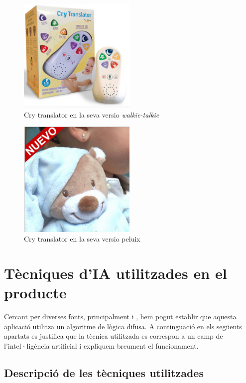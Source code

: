 \documentclass[11pt,a4paper]{article}
\begin{document}
\begin{figure}[hb]
\centering
\includegraphics[width=0.5\textwidth]{./fig/walkie.png}
\caption{Cry translator en la seva versio \emph{walkie-talkie}}
\label{fig:walkie}
\end{figure}

\begin{figure}[ht]
\centering
\includegraphics[width=0.5\textwidth]{./fig/peluix.png}
\caption{Cry translator en la seva versio peluix}
\label{fig:peluix}
\end{figure}

\section{\textsf{Tècniques d'IA utilitzades en el producte}}
\label{tecniques}

Cercant per diverses fonts, principalment \cite{patent} i \cite{elmundo}, hem pogut establir que aquesta aplicació utilitza un algoritme de lògica difusa. A continguació en els següents apartats es justifica que la tècnica utilitzada es correspon a un camp de l'intel·ligència artificial i expliquem breument el funcionament.

\subsection{\textsf{Descripció de les tècniques utilitzades}}
\label{descripcio}
\end{document}
